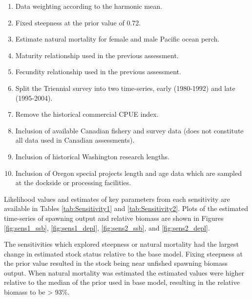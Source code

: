 \documentclass[12pt,]{article}
\begin{document}
\begin{enumerate}

  \item Data weighting according to the harmonic mean.
  
  \item Fixed steepness at the prior value of 0.72.
  
  \item Estimate natural mortality for female and male Pacific ocean perch.
  
  \item Maturity relationship used in the previous assessment.
  
  \item Fecundity relationship used in the previous assessment.
  
  \item Split the Triennial survey into two time-series, early (1980-1992) and late (1995-2004).
  
  \item Remove the historical commercial CPUE index.
  
  \item Inclusion of available Canadian fishery and survey data (does not constitute all data used in Canadian assessments).
  
  \item Inclusion of historical Washington research lengths.
  
  \item Inclusion of Oregon special projects length and age data which are sampled at the dockside or processing facilities.
  
\end{enumerate}

Likelihood values and estimates of key parameters from each sensitivity
are available in Tables \ref{tab:Sensitivity1} and
\ref{tab:Sensitivity2}. Plots of the estimated time-series of spawning
output and relative biomass are shown in Figures \ref{fig:sens1_ssb},
\ref{fig:sens1_depl}, \ref{fig:sens2_ssb}, and \ref{fig:sens2_depl}.

The sensitivities which explored steepness or natural mortality had the
largest change in estimated stock status relative to the base model.
Fixing steepness at the prior value resulted in the stock being near
unfished spawning biomass output. When natural mortality was estimated
the estimated values were higher relative to the median of the prior
used in base model, resulting in the relative biomass to be
\textgreater{} 93\%.
\end{document}
